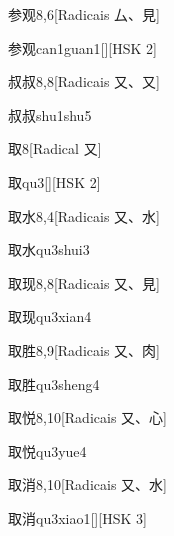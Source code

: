 \begin{entry}{参观}{8,6}[Radicais ⼛、⾒]
  \begin{phonetics}{参观}{can1guan1}[][HSK 2]
  \end{phonetics}
\end{entry}

\begin{entry}{叔叔}{8,8}[Radicais ⼜、⼜]
  \begin{phonetics}{叔叔}{shu1shu5}
  \end{phonetics}
\end{entry}

\begin{entry}{取}{8}[Radical ⼜]
  \begin{phonetics}{取}{qu3}[][HSK 2]
  \end{phonetics}
\end{entry}

\begin{entry}{取水}{8,4}[Radicais ⼜、⽔]
  \begin{phonetics}{取水}{qu3shui3}
  \end{phonetics}
\end{entry}

\begin{entry}{取现}{8,8}[Radicais ⼜、⾒]
  \begin{phonetics}{取现}{qu3xian4}
  \end{phonetics}
\end{entry}

\begin{entry}{取胜}{8,9}[Radicais ⼜、⾁]
  \begin{phonetics}{取胜}{qu3sheng4}
  \end{phonetics}
\end{entry}

\begin{entry}{取悦}{8,10}[Radicais ⼜、⼼]
  \begin{phonetics}{取悦}{qu3yue4}
  \end{phonetics}
\end{entry}

\begin{entry}{取消}{8,10}[Radicais ⼜、⽔]
  \begin{phonetics}{取消}{qu3xiao1}[][HSK 3]
  \end{phonetics}
\end{entry}

